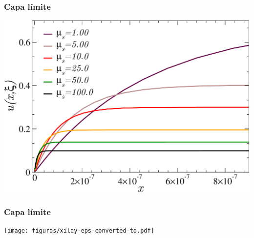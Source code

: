 \begin{frame}
\frametitle{Capa límite}
\centering
  \includegraphics[width=1.0\textwidth]{figuras/blayers.pdf}\\


\end{frame}


\begin{frame}
\frametitle{Capa límite}
\centering
  \texttt{[image: figuras/xilay-eps-converted-to.pdf]}\\


\end{frame}


